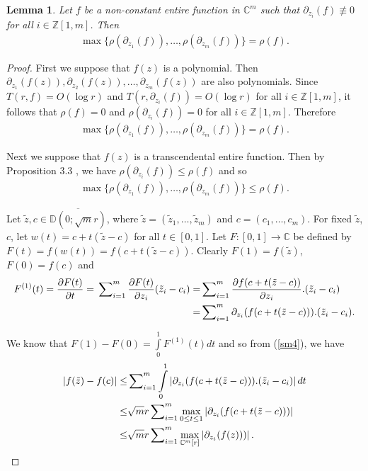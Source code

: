 \documentclass[11pt, reqno]{amsart}
\newtheorem{lem}{Lemma}[section]
\newcommand{\ol}{\overline}
\numberwithin{equation}{section}
\begin{document}
\begin{lem}\label{2L.1} Let $f$ be a non-constant entire function in $\mathbb{C}^m$ such that $\partial_{z_i}(f)\not\equiv 0$ for all $i\in\mathbb{Z}[1,m]$. Then 
\begin{align*}
\max\{\rho(\partial_{z_1}(f)),\ldots,\rho(\partial_{z_m}(f))\}=\rho(f).
\end{align*}
\end{lem}
\begin{proof} First we suppose that $f(z)$ is a polynomial. Then $\partial_{z_1}(f(z)),\partial_{z_2}(f(z)),\ldots, \partial_{z_m}(f(z))$ are also polynomials. Since $T(r,f)=O(\log r)$ and $T(r,\partial_{z_i}(f))=O(\log r)$ for all $i\in\mathbb{Z}[1,m]$, it follows that $\rho(f)=0$ and $\rho(\partial_{z_i}(f))=0$ for all $i\in\mathbb{Z}[1,m]$. Therefore 
\begin{align*}
\max\{\rho(\partial_{z_1}(f)),\ldots,\rho(\partial_{z_m}(f))\}=\rho(f).
\end{align*}

Next we suppose that $f(z)$ is a transcendental entire function. Then by Proposition 3.3 \cite{hy1}, we have $\rho(\partial_{z_i}(f))\leq \rho(f)$ and so
\begin{align}\label{sm2} 
\max\{\rho(\partial_{z_1}(f)),\ldots,\rho(\partial_{z_m}(f))\}\leq \rho(f).
\end{align}

Let $\tilde z, c\in \ol{\mathbb{D}(0;\sqrt{m} r)}$, where $\tilde z=(\tilde z_1,\ldots,\tilde z_m)$ and $c=(c_1,\ldots,c_m)$. For fixed $\tilde z$, $c$, let $w(t)=c+t(\tilde z-c)$ for all $t\in [0,1]$. Let $F: [0,1]\to \mathbb{C}$ be defined by $F(t)=f(w(t))=f(c+t(\tilde z-c))$. Clearly $F(1)=f(\tilde z)$, $F(0)=f(c)$ and 
\begin{align}\label{sm4} 
F^{(1)}(t)=\frac{\partial F(t)}{\partial t}=\sideset{}{_{i=1}^m}{\sum} \frac{\partial F(t)}{\partial z_i} (\tilde{z}_i-c_i)=&\sideset{}{_{i=1}^m}{\sum} \frac{\partial f(c+t(\tilde z-c))}{\partial z_i}.(\tilde{z}_i-c_i)\\=&\sideset{}{_{i=1}^m}{\sum} \partial_{z_i}(f(c+t(\tilde z-c))).(\tilde{z}_i-c_i)\nonumber.
\end{align}

We know that $F(1)-F(0)=\int\limits_{0}^1 F^{(1)}(t)dt$ and so from (\ref{sm4}), we have
\begin{align}\label{sm4a} 
|f(\tilde z)-f(c)|\leq& \sideset{}{_{i=1}^m}{\sum}\int\limits_0^1\left|\partial_{z_i}(f(c+t(\tilde z-c))).(\tilde{z}_i-c_i)\right|dt\\\leq& 
\sqrt{m}r \sideset{}{_{i=1}^m}{\sum}\max\limits_{0\leq t\leq 1}\left|\partial_{z_i}(f(c+t(\tilde z-c)))\right|\nonumber \\\leq&
\sqrt{m}r \sideset{}{_{i=1}^m}{\sum}\max\limits_{\mathbb{C}^m[r]}\left|\partial_{z_i}(f(z)))\right|.\nonumber
\end{align}


\end{proof}
\end{document}
